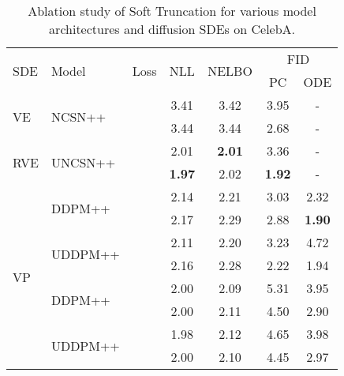 \documentclass[nohyperref]{article}
\theoremstyle{plain}
\theoremstyle{definition}
\theoremstyle{remark}
\begin{document}
\begin{table}[t]
\begin{minipage}[c]{0.5\textwidth}
\vskip 0.1in
\centering
	\caption{Ablation study of Soft Truncation for various model architectures and diffusion SDEs on CelebA.}
	\label{tab:ablation_architecture_sde}
	\vskip -0.05in
	\tiny
	\begin{tabular}{lllcccc}
		\toprule
		\multirow{2}{*}{SDE} & \multirow{2}{*}{Model} & \multirow{2}{*}{Loss} & \multirow{2}{*}{NLL} & \multirow{2}{*}{NELBO} & \multicolumn{2}{c}{FID} \\
		&&&&& PC & ODE \\\midrule
		\multirow{2}{*}{VE} & \multirow{2}{*}{NCSN++} &  & 3.41 & 3.42 & 3.95 & -\\
		& &  & 3.44 & 3.44 & 2.68 & -\\\midrule
		\multirow{2}{*}{RVE} & \multirow{2}{*}{UNCSN++} &  & 2.01 & \textbf{2.01} & 3.36 & -\\
		& &  & \textbf{1.97} & 2.02 & \textbf{1.92} & -\\\midrule
		\multirow{8}{*}[-9pt]{VP} & \multirow{2}{*}{DDPM++} &   & 2.14 & 2.21 & 3.03 & 2.32 \\
		& &  & 2.17 & 2.29 & 2.88 & \textbf{1.90}\\\cmidrule(lr){2-3}
		& \multirow{2}{*}{UDDPM++} &  & 2.11 & 2.20 & 3.23 & 4.72\\
		& &  & 2.16 & 2.28 & 2.22 & 1.94\\\cmidrule(lr){2-3}
		& \multirow{2}{*}{DDPM++} &  & 2.00 & 2.09 & 5.31 & 3.95\\
		& &  & 2.00 & 2.11 & 4.50 & 2.90\\\cmidrule(lr){2-3}
		& \multirow{2}{*}{UDDPM++} &  & 1.98 & 2.12 & 4.65 & 3.98\\
		& &  & 2.00 & 2.10 & 4.45 & 2.97\\
		\bottomrule
	\end{tabular}
	\end{minipage}
		\vskip -0.1in
\end{table}
\end{document}
